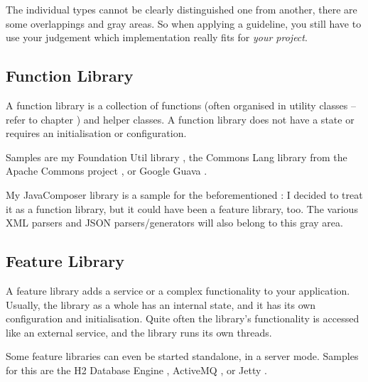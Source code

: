 The individual types cannot be clearly distinguished one from another, there are some overlappings and gray areas. So when applying a guideline, you still have to use your judgement which implementation really fits for \textit{your project}.


\subsection{Function Library}\label{sec:FunctionLibrary}
A function library is a collection of functions (often organised in utility classes – refer to chapter ) and helper classes. A function library does not have a state or requires an initialisation or configuration.

Samples are my Foundation Util library \autocite{TQUADRAT_ORG_FOUNDATION_UTIL}, the Commons Lang library from the Apache Commons project \autocite{APACHE_COMMONS_LANG}, or Google Guava \autocite{GOOGLE_GUAVA}.

My JavaComposer library \autocite{TQUADRAT_ORG_FOUNDATION_JAVACOMPOSER} is a sample for the beforementioned : I decided to treat it as a function library, but it could have been a feature library, too. The various XML parsers and JSON parsers/generators will also belong to this gray area. 


\subsection{Feature Library}\label{sec:FeatureLibrary}
A feature library adds a service or a complex functionality to your application. Usually, the library as a whole has an internal state, and it has its own configuration and initialisation. Quite often the library's functionality is accessed like an external service, and the library runs its own threads.

Some feature libraries can even be started standalone, in a server mode. Samples for this are the H2 Database Engine \autocite{H2_DATABASE}, ActiveMQ \autocite{APACHE_ACTIVEMQ}, or Jetty \autocite{ECLIPSE_JETTY}.


